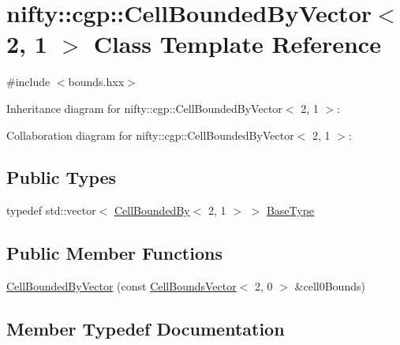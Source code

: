 \hypertarget{classnifty_1_1cgp_1_1CellBoundedByVector_3_012_00_011_01_4}{}\section{nifty\+:\+:cgp\+:\+:Cell\+Bounded\+By\+Vector$<$ 2, 1 $>$ Class Template Reference}
\label{classnifty_1_1cgp_1_1CellBoundedByVector_3_012_00_011_01_4}


{\ttfamily \#include $<$bounds.\+hxx$>$}



Inheritance diagram for nifty\+:\+:cgp\+:\+:Cell\+Bounded\+By\+Vector$<$ 2, 1 $>$\+:


Collaboration diagram for nifty\+:\+:cgp\+:\+:Cell\+Bounded\+By\+Vector$<$ 2, 1 $>$\+:
\subsection*{Public Types}
\begin{DoxyCompactItemize}
\item 
typedef std\+::vector$<$ \hyperlink{classnifty_1_1cgp_1_1CellBoundedBy}{Cell\+Bounded\+By}$<$ 2, 1 $>$ $>$ \hyperlink{classnifty_1_1cgp_1_1CellBoundedByVector_3_012_00_011_01_4_ae67b7b5bea502cf53791b047577eff16}{Base\+Type}
\end{DoxyCompactItemize}
\subsection*{Public Member Functions}
\begin{DoxyCompactItemize}
\item 
\hyperlink{classnifty_1_1cgp_1_1CellBoundedByVector_3_012_00_011_01_4_a234e9640290d247f90261787b95fcc90}{Cell\+Bounded\+By\+Vector} (const \hyperlink{classnifty_1_1cgp_1_1CellBoundsVector}{Cell\+Bounds\+Vector}$<$ 2, 0 $>$ \&cell0\+Bounds)
\end{DoxyCompactItemize}


\subsection{Member Typedef Documentation}
\hypertarget{classnifty_1_1cgp_1_1CellBoundedByVector_3_012_00_011_01_4_ae67b7b5bea502cf53791b047577eff16}{}
